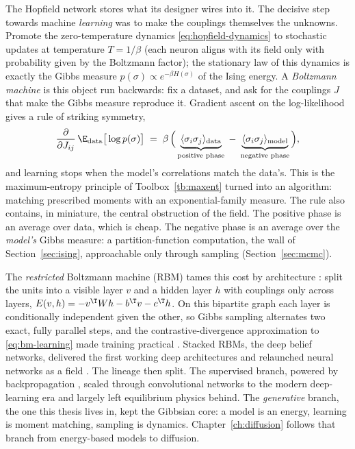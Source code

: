 The Hopfield network stores what its designer wires into it. The decisive
step towards machine \emph{learning} was to make the couplings themselves
the unknowns. Promote the zero-temperature dynamics
\eqref{eq:hopfield-dynamics} to stochastic updates at temperature
$T = 1/\beta$ (each neuron aligns with its field only with probability
given by the Boltzmann factor); the stationary law of this dynamics is
exactly the Gibbs measure $p(\sigma) \propto e^{-\beta H(\sigma)}$ of the
Ising energy. A \emph{Boltzmann machine} \citep{ackley1985learning} is
this object run backwards: fix a dataset, and ask for the couplings $J$
that make the Gibbs measure reproduce it. Gradient ascent on the
log-likelihood gives a rule of striking symmetry,
\begin{equation}
  \frac{\partial}{\partial J_{ij}} \,\E_{\text{data}}\big[\log p(\sigma)\big]
  \;=\; \beta\,\Big(
  \underbrace{\langle \sigma_i \sigma_j \rangle_{\text{data}}}_{\text{positive phase}}
  \;-\;
  \underbrace{\langle \sigma_i \sigma_j \rangle_{\text{model}}}_{\text{negative phase}}
  \Big),
  \label{eq:bm-learning}
\end{equation}
and learning stops when the model's correlations match the data's. This
is the maximum-entropy principle of Toolbox~\ref{tb:maxent} turned into
an algorithm: matching prescribed moments with an exponential-family
measure. The rule also contains, in miniature, the central obstruction of
the field. The positive phase is an average over data, which is cheap.
The negative phase is an average over the \emph{model's} Gibbs measure: a
partition-function computation, the wall of Section~\ref{sec:ising},
approachable only through sampling
(Section~\ref{sec:mcmc}).

The \emph{restricted} Boltzmann machine (RBM) tames this cost by
architecture \citep{smolensky1986information}: split the units into a
visible layer $v$ and a hidden layer $h$ with couplings only across
layers, $E(v,h) = -v^\T W h - b^\T v - c^\T h$. On this bipartite graph
each layer is conditionally independent given the other, so Gibbs
sampling alternates two exact, fully parallel steps, and the
contrastive-divergence approximation to \eqref{eq:bm-learning} made
training practical \citep{hinton2002training}. Stacked RBMs, the deep
belief networks, delivered the first working deep architectures and
relaunched neural networks as a field \citep{hinton2006fast}. The lineage
then split. The supervised branch, powered by backpropagation
\citep{rumelhart1986learning}, scaled through convolutional networks to
the modern deep-learning era \citep{krizhevsky2012imagenet,
lecun2015deep} and largely left equilibrium physics behind. The
\emph{generative} branch, the one this thesis lives in, kept the Gibbsian
core: a model is an energy, learning is moment matching, sampling is
dynamics. Chapter~\ref{ch:diffusion} follows that branch from
energy-based models to diffusion.

